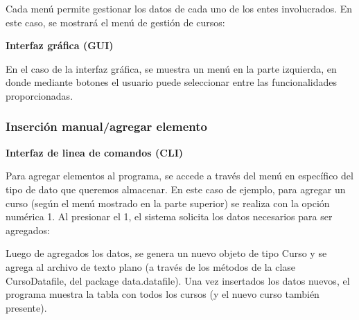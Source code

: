 
Cada menú permite gestionar los datos de cada uno de los entes involucrados. En este caso, se mostrará el menú de gestión de cursos:


\clearpage

\textbf{Interfaz gráfica (GUI)}

En el caso de la interfaz gráfica, se muestra un menú en la parte izquierda, en donde mediante botones el usuario puede seleccionar entre las funcionalidades proporcionadas.

\begin{figure}[h]
    \centering
\end{figure}

\subsubsection{Inserción manual/agregar elemento}

\textbf{Interfaz de linea de comandos (CLI)}

Para agregar elementos al programa, se accede a través del menú en específico del tipo de dato que queremos almacenar. En este caso de ejemplo, para agregar un curso (según el menú mostrado en la parte superior) se realiza con la opción numérica 1. Al presionar el 1, el sistema solicita los datos necesarios para ser agregados:


Luego de agregados los datos, se genera un nuevo objeto de tipo Curso y se agrega al archivo de texto plano (a través de los métodos de la clase CursoDatafile, del package data.datafile). Una vez insertados los datos nuevos, el programa muestra la tabla con todos los cursos (y el nuevo curso también presente).\\

